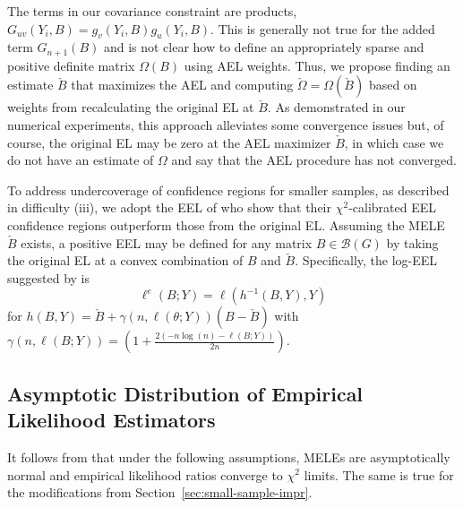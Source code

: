 \documentclass[notitlepage]{article}
\begin{document}
The terms in our covariance constraint are products,
$G_{uv}(Y_i,B)=g_v(Y_i,B)g_u(Y_i,B)$.  This is generally not true for
the added term $G_{n+1}(B)$ and is not clear how to define an
appropriately sparse and positive definite matrix
$\Omega(B)$ using AEL weights.  Thus, we propose finding an
estimate $\check B$ that maximizes the AEL and computing
$\check \Omega=\Omega(\check B)$ based on weights from
recalculating the original EL at $\check B$.  As demonstrated in
our numerical experiments, this approach alleviates some convergence
issues but, of course, the original EL may be zero at the AEL
maximizer $\check B$, in which case we do not have an estimate of
$\Omega$ and say that the AEL procedure has not converged.

To address undercoverage of confidence regions for smaller samples, as
described in difficulty (iii), we adopt the EEL of
\citet{tsao2014extended} who show that their $\chi^2$-calibrated EEL
confidence regions outperform those from the original EL.  Assuming
the MELE $\check B$ exists, a positive EEL may be defined for any
matrix $B\in\mathcal{B}(G)$ by taking the original EL at a convex
combination of $B$ and $\check B$.  Specifically, the log-EEL
suggested by \citet{tsao2014extended} is
\begin{equation}
\ell^e(B; Y) = \ell(h^{-1}(B, Y), Y)
\end{equation}
for $ h(B, Y) = \check B + \gamma(n, \ell(\theta; Y))(B - \check B)$
with $\gamma(n, \ell(B; Y)) = \left(1 + \frac{2(-n\log(n) - \ell(B; Y))}{2n}\right)$.


\subsection{Asymptotic Distribution of Empirical Likelihood
  Estimators} \label{sec:asymp}

It follows from \citet[Theorem 1]{qin1994empirical} that under the
following assumptions, MELEs are asymptotically normal and empirical
likelihood ratios converge to $\chi^2$ limits.  The same is true for
the modifications from Section~\ref{sec:small-sample-impr}.
\end{document}
